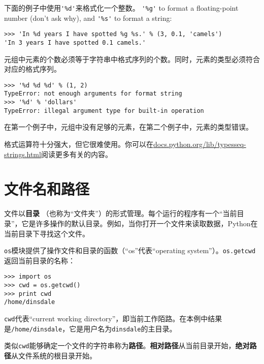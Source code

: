 下面的例子中使用\verb"'%d'"来格式化一个整数。
\verb"'%g'" to format
a floating-point number (don't ask why), and \verb"'%s'" to format
a string:

\beforeverb
\begin{verbatim}
>>> 'In %d years I have spotted %g %s.' % (3, 0.1, 'camels')
'In 3 years I have spotted 0.1 camels.'
\end{verbatim}
\afterverb
%
元组中元素的个数必须等于字符串中格式序列的个数。同时，元素的类型必须符合对应的格式序列。


\beforeverb
\begin{verbatim}
>>> '%d %d %d' % (1, 2)
TypeError: not enough arguments for format string
>>> '%d' % 'dollars'
TypeError: illegal argument type for built-in operation
\end{verbatim}
\afterverb
%
在第一个例子中，元组中没有足够的元素，在第二个例子中，元素的类型错误。

格式运算符十分强大，但它很难使用。你可以在\url{docs.python.org/lib/typesseq-strings.html}阅读更多有关的内容。


\section{文件名和路径}
\label{路径}


文件以{\bf 目录} （也称为“文件夹”）的形式管理。每个运行的程序有一个“当前目录”，它是许多操作的默认目录。例如，当你打开一个文件来读取数据，Python在当前目录下寻找这个文件。


{\tt os}模块提供了操作文件和目录的函数（“os”代表“operating system”）。{\tt os.getcwd}返回当前目录的名称：


\beforeverb
\begin{verbatim}
>>> import os
>>> cwd = os.getcwd()
>>> print cwd
/home/dinsdale
\end{verbatim}
\afterverb
%
{\tt cwd}代表“current working directory”，即当前工作陌路。在本例中结果是{\tt /home/dinsdale}，它是用户名为{\tt dinsdale}的主目录。

类似{\tt cwd}能够确定一个文件的字符串称为{\bf 路径}。{\bf 相对路径}从当前目录开始，{\bf 绝对路径}从文件系统的根目录开始。

